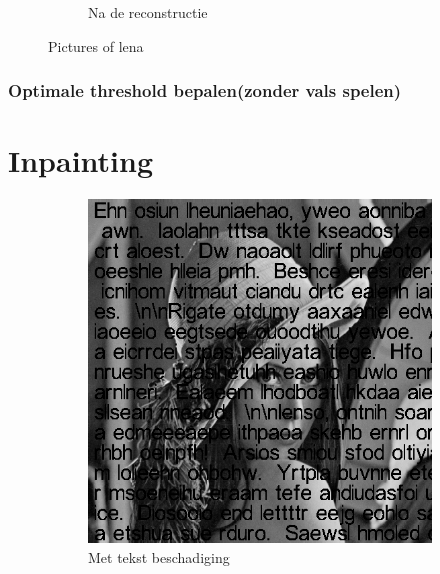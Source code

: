 \begin{figure}
\begin{subfigure}[b]{0.45\textwidth}
        \caption{Na de reconstructie}
        \label{fig:mouse}
    \end{subfigure}
    \caption{Pictures of lena}\label{fig:optimaleRuisBIOR}
\end{figure}


\subsubsection{Optimale threshold bepalen(zonder vals spelen)}




\section{Inpainting}

\begin{figure}
    \centering
    \begin{subfigure}[b]{0.45\textwidth}
        \includegraphics[width=\textwidth]{../src/inpainting/lena_broke}
        \caption{Met tekst beschadiging}
        \label{fig:tiger}
    \end{subfigure}
    ~ %
    \begin{subfigure}[b]{0.45\textwidth}

\end{subfigure}
\end{figure}
